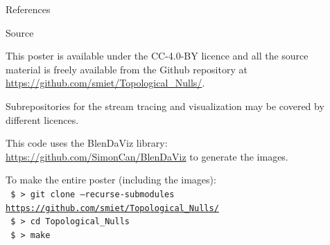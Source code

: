 \documentclass[final]{beamer}
\newlength{\sepwid}
\newlength{\onecolwid}
\begin{document}
\begin{frame}[t]
\begin{columns}[t]
\begin{column}{\onecolwid}
\begin{block}{References}
\nocite{*} %
\small{
\vspace{0.75in}}

\end{block}

\begin{block}{Source}
\begin{centering}
    \hfill
    \hfill
\end{centering}

	\vspace{1cm}
This poster is available under the  CC-4.0-BY  licence and all the source material is freely
available from the Github repository at \url{https://github.com/smiet/Topological_Nulls/}.

Subrepositories for the stream tracing and visualization may be covered by different licences. 

This code uses the BlenDaViz library: \url{https://github.com/SimonCan/BlenDaViz} to generate the images. 

    To make the entire poster (including the images):\\
\texttt{
	\$ > git clone --recurse-submodules  \url{https://github.com/smiet/Topological_Nulls/}}\\
\texttt{
    \$ > cd Topological\_Nulls\\
  }
\texttt{
    \$ > make
  }


\end{block}

\end{column} %

\begin{column}{\sepwid}\end{column} %


\end{columns} %

\end{frame} %
\end{document}
